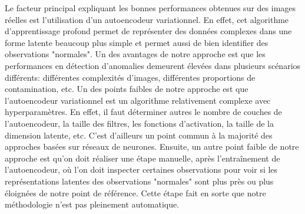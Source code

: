  Le facteur principal expliquant les bonnes performances obtenues sur des images réelles est l'utilisation d'un autoencodeur variationnel. En effet, cet algorithme d'apprentissage profond permet de représenter des données complexes dans une forme latente beaucoup plus simple et permet aussi de bien identifier des observations "normales". Un des avantages de notre approche est que les performances en détection d'anomalies demeurent élevées dans plusieurs scénarios différents: différentes complexités d'images, différentes proportions de contamination, etc. Un des points faibles de notre approche est que l'autoencodeur variationnel est un algorithme relativement complexe avec \DIFdelbegin {}\DIFdelend \DIFaddbegin {}\DIFaddend hyperparamètres. En effet, il faut déterminer \DIFdelbegin {}\DIFdelend \DIFaddbegin {}\DIFaddend autres le nombre de couches de l'autoencodeur, la taille des filtres, les fonctions d'activation, la taille de la dimension latente, etc. C'est d'ailleurs un point commun à la majorité des approches basées sur \DIFdelbegin {}\DIFdelend \DIFaddbegin {}\DIFaddend réseaux de neurones. Ensuite, un autre point faible de notre approche est qu'on doit réaliser une étape manuelle, après l'entraînement de l'autoencodeur, où l'on doit inspecter certaines observations pour voir si les représentations latentes des observations "normales" sont plus près ou plus éloignées de notre point de référence\DIFaddbegin {}\DIFaddend . Cette étape fait en sorte que notre méthodologie n'est pas pleinement automatique.

